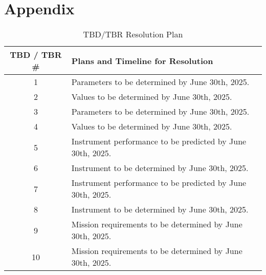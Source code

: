 \section*{Appendix}

\begin{table}[H]
\centering
\caption{TBD/TBR Resolution Plan}
\renewcommand{\arraystretch}{1.6}
\small
\begin{tabular}{|c|p{13cm}|}
\hline
\textbf{TBD / TBR \#} & \textbf{Plans and Timeline for Resolution} \\
\hline
1 & Parameters to be determined by June 30th, 2025. \\
2 & Values to be determined by June 30th, 2025. \\
3 & Parameters to be determined by June 30th, 2025. \\
4 & Values to be determined by June 30th, 2025. \\
5 & Instrument performance to be predicted by June 30th, 2025. \\
6 & Instrument to be determined by June 30th, 2025. \\
7 & Instrument performance to be predicted by June 30th, 2025. \\
8 & Instrument to be determined by June 30th, 2025. \\
9 & Mission requirements to be determined by June 30th, 2025. \\
10 & Mission requirements to be determined by June 30th, 2025. \\
\hline
\end{tabular}
\end{table}